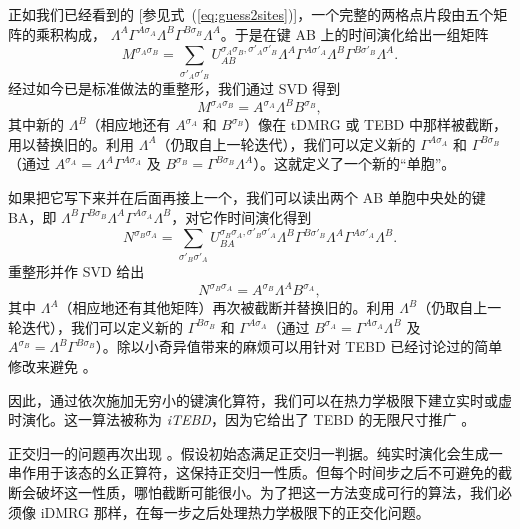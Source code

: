 \documentclass[a4paper,10pt,oneside,onecolumn,1p,times]{elsarticle}
\begin{document}
正如我们已经看到的 [参见式~(\ref{eq:guess2sites})]，一个完整的两格点片段由五个矩阵的乘积构成，
$\Lambda^A \Gamma^{A \sigma_A} \Lambda^B \Gamma^{B \sigma_{B}} \Lambda^A$。于是在键 AB 上的时间演化给出一组矩阵
\begin{equation}
M^{\sigma_A\sigma_{B}} = \sum_{\sigma'_A\sigma'_{B}} U_{AB}^ {\sigma_A\sigma_{B}, \sigma'_A\sigma'_{B}}  \Lambda^A \Gamma^{A \sigma'_A} \Lambda^B \Gamma^{B \sigma'_{B}} \Lambda^A .
\end{equation}
经过如今已是标准做法的重整形，我们通过 SVD 得到
\begin{equation}
M^{\sigma_A\sigma_{B}}=A^{\sigma_A} \Lambda^B B^{\sigma_{B}} ,
\end{equation}
其中新的 $\Lambda^B$（相应地还有 $A^{\sigma_A}$ 和 $B^{\sigma_{B}}$）像在 tDMRG 或 TEBD 中那样被截断，用以替换旧的。利用 $\Lambda^A$（仍取自上一轮迭代），我们可以定义新的 $\Gamma^{A \sigma_A}$ 和 $\Gamma^{B \sigma_{B}} $（通过 $A^{\sigma_A} = \Lambda^A \Gamma^{A \sigma_A}$ 及
$B^{\sigma_{B}} = \Gamma^{B \sigma_{B}} \Lambda^A$）。这就定义了一个新的“单胞”。

如果把它写下来并在后面再接上一个，我们可以读出两个 AB 单胞中央处的键 BA，即
$ \Lambda^B \Gamma^{B \sigma_{B}} \Lambda^A \Gamma^{A \sigma_{A}} \Lambda^B$，对它作时间演化得到
\begin{equation}
N^{\sigma_{B}\sigma_{A}} = \sum_{\sigma'_{B}\sigma'_{A}} U_{BA}^ {\sigma_{B}\sigma_{A}, \sigma'_{B}\sigma'_{A}}  \Lambda^B \Gamma^{B \sigma'_{B}} \Lambda^A \Gamma^{A \sigma'_{A}} \Lambda^B .
\end{equation}
重整形并作 SVD 给出
\begin{equation}
N^{\sigma_{B}\sigma_{A}}=A^{\sigma_{B}} \Lambda^A B^{\sigma_{A}} ,
\end{equation}
其中 $\Lambda^A$（相应地还有其他矩阵）再次被截断并替换旧的。利用 $\Lambda^B$（仍取自上一轮迭代），我们可以定义新的 $\Gamma^{B \sigma_{B}}$ 和 $\Gamma^{A \sigma_{A}} $（通过 $B^{\sigma_{A}} =   \Gamma^{A \sigma_{A}} \Lambda^B$ 及 $A^{\sigma_{B}} =\Lambda^B \Gamma^{B \sigma_{B}}$）。除以小奇异值带来的麻烦可以用针对 TEBD 已经讨论过的简单修改来避免 \cite{Hastings09}。

因此，通过依次施加无穷小的键演化算符，我们可以在热力学极限下建立实时或虚时演化。这一算法被称为 {\em iTEBD}，因为它给出了 TEBD 的无限尺寸推广 \cite{Vidal07}。

正交归一的问题再次出现 \cite{Orus08}。假设初始态满足正交归一判据。纯实时演化会生成一串作用于该态的幺正算符，这保持正交归一性质。但每个时间步之后不可避免的截断会破坏这一性质，哪怕截断可能很小。为了把这一方法变成可行的算法，我们必须像 iDMRG 那样，在每一步之后处理热力学极限下的正交化问题。
\end{document}
